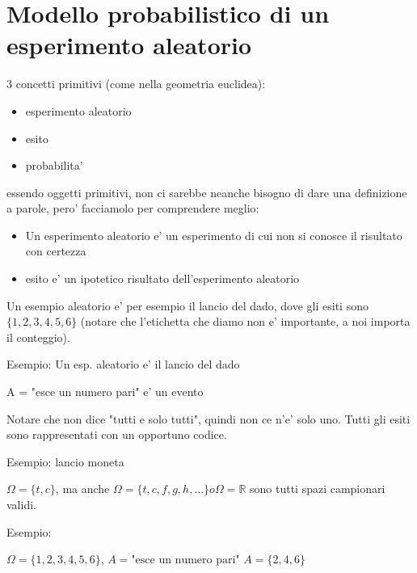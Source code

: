 \documentclass{report}
\begin{document}
\section{Modello probabilistico di un esperimento aleatorio}
3 concetti primitivi (come nella geometria euclidea):
\begin{itemize}
\item esperimento aleatorio
\item esito
\item probabilita'
\end{itemize}

essendo oggetti primitivi, non ci sarebbe neanche bisogno di dare una definizione a parole, pero' facciamolo per comprendere meglio:

\begin{itemize}
\item Un esperimento aleatorio e' un esperimento di cui non si conosce il risultato con certezza
\item esito e' un ipotetico risultato dell'esperimento aleatorio
\end{itemize}

Un esempio aleatorio e' per esempio il lancio del dado, dove gli esiti sono $ \{1,2,3,4,5,6\} $ (notare che l'etichetta che diamo non e' importante, a noi importa il conteggio). 



Esempio: Un esp. aleatorio e' il lancio del dado

A = "esce un numero pari" e' un evento


Notare che non dice "tutti e solo tutti", quindi non ce n'e' solo uno. Tutti gli esiti sono rappresentati con un opportuno codice.

Esempio: lancio moneta

$ \Omega = \{t,c\} $, ma anche $ \Omega = \{t,c,f,g,h,...\} o \Omega = \mathbb{R} $ sono tutti spazi campionari validi.



Esempio: 

$ \Omega = \{1,2,3,4,5,6\} $, $ A = \text{"esce un numero pari"} $
$ A = \{2,4,6\} $
\end{document}
